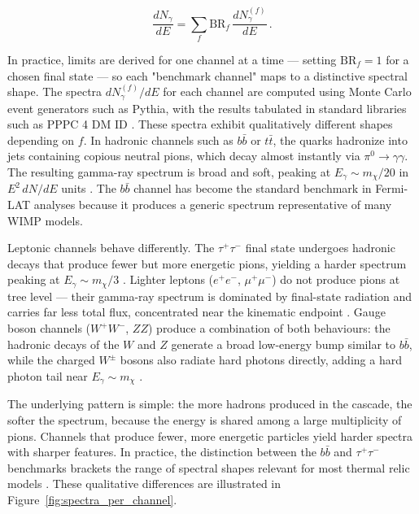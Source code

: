 \begin{equation}
	\frac{dN_\gamma}{dE} = \sum_f \text{BR}_f \, \frac{dN_\gamma^{(f)}}{dE} \,.
	\label{eq:spectrum_sum}
\end{equation}

In practice, limits are derived for one channel at a time --- setting $\text{BR}_f = 1$ for a chosen final state --- so each "benchmark channel" maps to a distinctive spectral shape.
The spectra $dN_\gamma^{(f)}/dE$ for each channel are computed using Monte Carlo event generators such as Pythia, with the results tabulated in standard libraries such as PPPC 4 DM ID \cite{Cirelli:2010xx,Hooper:2024}.
These spectra exhibit qualitatively different shapes depending on $f$.
In hadronic channels such as $b\bar{b}$ or $t\bar{t}$, the quarks hadronize into jets containing copious neutral pions, which decay almost instantly via $\pi^0 \to \gamma\gamma$.
The resulting gamma-ray spectrum is broad and soft, peaking at $E_\gamma \sim m_\chi / 20$ in $E^2 \, dN/dE$ units \cite{Hooper:2024,Cirelli:2024ssz}.
The $b\bar{b}$ channel has become the standard benchmark in Fermi-LAT analyses because it produces a generic spectrum representative of many WIMP models.

Leptonic channels behave differently.
The $\tau^+\tau^-$ final state undergoes hadronic decays that produce fewer but more energetic pions, yielding a harder spectrum peaking at $E_\gamma \sim m_\chi / 3$ \cite{Hooper:2024}.
Lighter leptons ($e^+e^-$, $\mu^+\mu^-$) do not produce pions at tree level --- their gamma-ray spectrum is dominated by final-state radiation and carries far less total flux, concentrated near the kinematic endpoint \cite{Cirelli:2024ssz}.
Gauge boson channels ($W^+W^-$, $ZZ$) produce a combination of both behaviours: the hadronic decays of the $W$ and $Z$ generate a broad low-energy bump similar to $b\bar{b}$, while the charged $W^\pm$ bosons also radiate hard photons directly, adding a hard photon tail near $E_\gamma \sim m_\chi$ \cite{Cirelli:2024ssz}.

The underlying pattern is simple: the more hadrons produced in the cascade, the softer the spectrum, because the energy is shared among a large multiplicity of pions.
Channels that produce fewer, more energetic particles yield harder spectra with sharper features.
In practice, the distinction between the $b\bar{b}$ and $\tau^+\tau^-$ benchmarks brackets the range of spectral shapes relevant for most thermal relic models \cite{Hooper:2024}.
These qualitative differences are illustrated in Figure~\ref{fig:spectra_per_channel}.

